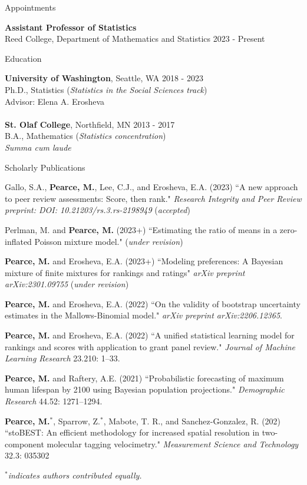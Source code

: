 \documentclass{resume} %
\begin{document}

\begin{rSection}{Appointments}

{\bf Assistant Professor of Statistics}
\\ Reed College, Department of Mathematics and Statistics \hfill{2023 - Present}
\end{rSection}

\begin{rSection}{Education}

{\bf University of Washington}, Seattle, WA \hfill {2018 - 2023} 
\\ Ph.D., Statistics ({\it Statistics in the Social Sciences track})
\\ Advisor: Elena A. Erosheva
\\
\\{\bf St. Olaf College}, Northfield, MN \hfill {2013 - 2017} 
\\ B.A., Mathematics ({\it Statistics concentration})
\\ {\it Summa cum laude}
\end{rSection}


\begin{rSection}{Scholarly Publications}

Gallo, S.A., {\bf Pearce, M.}, Lee, C.J., and Erosheva, E.A. (2023) ``A new approach to peer review assessments: Score, then rank." \textit{Research Integrity and Peer Review preprint: DOI: 10.21203/rs.3.rs-2198949} (\textit{accepted})

Perlman, M. and {\bf Pearce, M.} (2023+) ``Estimating the ratio of means in a zero-inflated Poisson mixture model." (\textit{under revision})

{\bf Pearce, M.} and Erosheva, E.A. (2023+) ``Modeling preferences: A Bayesian mixture of finite mixtures for rankings and ratings" \textit{arXiv preprint arXiv:2301.09755} (\textit{under revision})

{\bf Pearce, M.} and Erosheva, E.A. (2022) ``On the validity of bootstrap uncertainty estimates in the Mallows-Binomial model." \textit{arXiv preprint arXiv:2206.12365}.

{\bf Pearce, M.} and Erosheva, E.A. (2022) ``A unified statistical learning model for rankings and scores with application to grant panel review." \textit{Journal of Machine Learning Research} 23.210: 1--33.

{\bf Pearce, M.} and Raftery, A.E. (2021) ``Probabilistic forecasting of maximum human lifespan by 2100 using Bayesian population projections." {\em Demographic Research} 44.52: 1271--1294.

{\bf Pearce, M.}$^*$, Sparrow, Z.$^*$, Mabote, T. R., and Sanchez-Gonzalez, R. (202) ``stoBEST: An efficient methodology for increased spatial resolution in two-component molecular tagging velocimetry." {\em Measurement Science and Technology} 32.3: 035302

{\em $^*$indicates authors contributed equally.}
\end{rSection}
\end{document}
